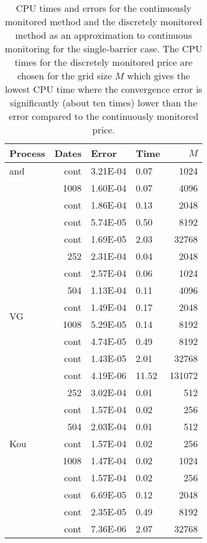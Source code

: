 \documentclass[11pt,a4paper]{article}
\begin{document}
\begin{table}[h]
\centering
\begin{tabular}{lrllr}
\hline\hline
Process & Dates & Error & Time & $M$\\
\hline and & cont & 3.21E-04 & 0.07 & 1024\\
\cline{2-5}
& 1008 & 1.60E-04 & 0.07 & 4096\\
& cont & 1.86E-04 & 0.13 & 2048\\
\cline{2-5}
& cont & 5.74E-05 & 0.50 & 8192\\
\cline{2-5}
& cont & 1.69E-05 & 2.03& 32768\\
\hline
\multirow{8}{*}{VG} & 252 & 2.31E-04 & 0.04 & 2048\\
& cont & 2.57E-04 & 0.06 & 1024\\
\cline{2-5}
& 504 & 1.13E-04 & 0.11 & 4096\\
& cont & 1.49E-04 & 0.17 & 2048\\
\cline{2-5}
& 1008 & 5.29E-05 & 0.14 & 8192\\
& cont & 4.74E-05 & 0.49 & 8192\\
\cline{2-5}
& cont & 1.43E-05 & 2.01 & 32768\\
\cline{2-5}
& cont & 4.19E-06 & 11.52 & 131072\\
\hline
\multirow{7}{*}{Kou} & 252 & 3.02E-04 & 0.01 & 512\\
& cont & 1.57E-04 & 0.02& 256\\
\cline{2-5}
& 504 & 2.03E-04 & 0.01 & 512\\
& cont & 1.57E-04 & 0.02& 256\\
\cline{2-5}
& 1008 & 1.47E-04 & 0.02 & 1024\\
& cont & 1.57E-04 & 0.02& 256\\
\cline{2-5}
& cont & 6.69E-05 & 0.12 & 2048\\
\cline{2-5}
& cont & 2.35E-05 & 0.49 & 8192\\
\cline{2-5}
& cont & 7.36E-06 & 2.07 & 32768\\
\hline\hline
\end{tabular}
\caption{CPU times and errors for the continuously monitored method and the discretely monitored method as an approximation to continuous monitoring for the single-barrier case. The CPU times for the discretely monitored price are chosen for the grid size $M$ which gives the lowest CPU time where the convergence error is significantly (about ten times) lower than the error compared to the continuously monitored price.}
\label{tab:SingerrvCPUcomparison}
\end{table}
\end{document}
